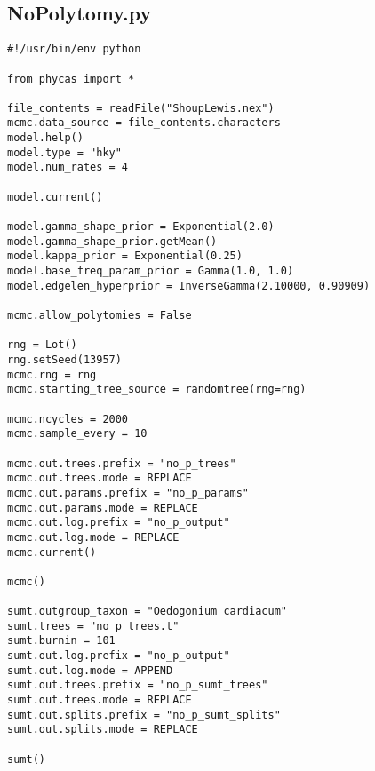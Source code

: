 \documentclass{article}
\begin{document}
\newpage
\subsection{NoPolytomy.py}\label{NoPolytomy}
\begin{verbatim}
#!/usr/bin/env python

from phycas import *

file_contents = readFile("ShoupLewis.nex")
mcmc.data_source = file_contents.characters
model.help()
model.type = "hky"
model.num_rates = 4

model.current()

model.gamma_shape_prior = Exponential(2.0)
model.gamma_shape_prior.getMean()
model.kappa_prior = Exponential(0.25)
model.base_freq_param_prior = Gamma(1.0, 1.0)
model.edgelen_hyperprior = InverseGamma(2.10000, 0.90909)

mcmc.allow_polytomies = False

rng = Lot()
rng.setSeed(13957)
mcmc.rng = rng
mcmc.starting_tree_source = randomtree(rng=rng)

mcmc.ncycles = 2000
mcmc.sample_every = 10

mcmc.out.trees.prefix = "no_p_trees" 
mcmc.out.trees.mode = REPLACE 
mcmc.out.params.prefix = "no_p_params" 
mcmc.out.params.mode = REPLACE 
mcmc.out.log.prefix = "no_p_output" 
mcmc.out.log.mode = REPLACE 
mcmc.current()

mcmc()

sumt.outgroup_taxon = "Oedogonium cardiacum" 
sumt.trees = "no_p_trees.t" 
sumt.burnin = 101 
sumt.out.log.prefix = "no_p_output" 
sumt.out.log.mode = APPEND 
sumt.out.trees.prefix = "no_p_sumt_trees" 
sumt.out.trees.mode = REPLACE 
sumt.out.splits.prefix = "no_p_sumt_splits" 
sumt.out.splits.mode = REPLACE 

sumt()
\end{verbatim}


\newpage
\end{document}
